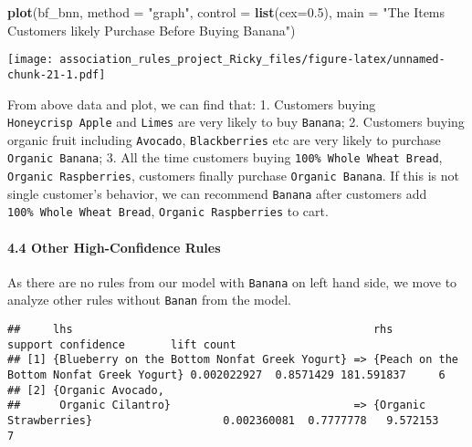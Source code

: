 \documentclass[]{article}
\newenvironment{Shaded}{\begin{snugshade}}{\end{snugshade}}
\newcommand{\CommentTok}[1]{\textcolor[rgb]{0.56,0.35,0.01}{\textit{#1}}}
\newcommand{\DataTypeTok}[1]{\textcolor[rgb]{0.13,0.29,0.53}{#1}}
\newcommand{\DecValTok}[1]{\textcolor[rgb]{0.00,0.00,0.81}{#1}}
\newcommand{\FloatTok}[1]{\textcolor[rgb]{0.00,0.00,0.81}{#1}}
\newcommand{\KeywordTok}[1]{\textcolor[rgb]{0.13,0.29,0.53}{\textbf{#1}}}
\newcommand{\NormalTok}[1]{#1}
\newcommand{\OperatorTok}[1]{\textcolor[rgb]{0.81,0.36,0.00}{\textbf{#1}}}
\newcommand{\StringTok}[1]{\textcolor[rgb]{0.31,0.60,0.02}{#1}}
\let\oldparagraph\paragraph
\renewcommand{\paragraph}[1]{\oldparagraph{#1}\mbox{}}
\begin{document}
\begin{Shaded}
\begin{Highlighting}[]
\KeywordTok{plot}\NormalTok{(bf_bnn, }\DataTypeTok{method =} \StringTok{"graph"}\NormalTok{, }\DataTypeTok{control =} \KeywordTok{list}\NormalTok{(}\DataTypeTok{cex=}\FloatTok{0.5}\NormalTok{), }
     \DataTypeTok{main =} \StringTok{"The Items Customers likely Purchase Before Buying Banana"}\NormalTok{)}
\end{Highlighting}
\end{Shaded}

\texttt{[image: association\_rules\_project\_Ricky\_files/figure-latex/unnamed-chunk-21-1.pdf]}

From above data and plot, we can find that: 1. Customers buying
\texttt{Honeycrisp\ Apple} and \texttt{Limes} are very likely to buy
\texttt{Banana}; 2. Customers buying organic fruit including
\texttt{Avocado}, \texttt{Blackberries} etc are very likely to purchase
\texttt{Organic\ Banana}; 3. All the time customers buying
\texttt{100\%\ Whole\ Wheat\ Bread}, \texttt{Organic\ Raspberries},
customers finally purchase \texttt{Organic\ Banana}. If this is not
single customer's behavior, we can recommend \texttt{Banana} after
customers add \texttt{100\%\ Whole\ Wheat\ Bread},
\texttt{Organic\ Raspberries} to cart.

\hypertarget{other-high-confidence-rules}{%
\paragraph{4.4 Other High-Confidence
Rules}\label{other-high-confidence-rules}}

As there are no rules from our model with \texttt{Banana} on left hand
side, we move to analyze other rules without \texttt{Banan} from the
model.

\begin{Shaded}
\end{Shaded}

\begin{verbatim}
##     lhs                                              rhs                                           support confidence       lift count
## [1] {Blueberry on the Bottom Nonfat Greek Yogurt} => {Peach on the Bottom Nonfat Greek Yogurt} 0.002022927  0.8571429 181.591837     6
## [2] {Organic Avocado,                                                                                                                 
##      Organic Cilantro}                            => {Organic Strawberries}                    0.002360081  0.7777778   9.572153     7
\end{verbatim}
\end{document}
